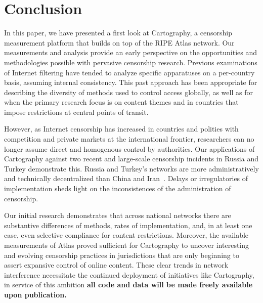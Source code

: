 \section{Conclusion}
\label{sec:conclusion}

In this paper, we have presented a first look at \textsf{Cartography}, a censorship measurement platform that builds on top of the RIPE Atlas network.  Our measurements and analysis provide an early perspective on the opportunities and methodologies possible with pervasive censorship research. Previous examinations of Internet filtering have tended to analyze specific apparatuses on a per-country basis, assuming internal consistency. This past approach has been appropriate for describing the diversity of methods used to control access globally, as well as for when the primary research focus is on content themes and in countries that impose restrictions at central points of transit. 

However, as Internet censorship has increased in countries and polities with competition and private markets at the international frontier, researchers can no longer assume direct and homogenous control by authorities. Our applications of Cartography against two recent and
large-scale censorship incidents in Russia and Turkey demonstrate this. Russia and Turkey's networks are more administratively and technically decentralized than China and Iran~\cite{Roberts2011}. Delays or irregulatories of implementation sheds light on the inconsistences of the administration of censorship. 

Our initial research demonstrates that across national networks there are substantive differences of methods, rates of implementation, and, in at least one case, even selective compliance for content restrictions. Moreover, the available measurements of Atlas proved sufficient for Cartography to uncover interesting and evolving censorship practices in jurisdictions that are only beginning to assert expansive control of online content. These clear trends in network interference necessitate the continued deployment of initiatives like Cartography, in service of this ambition \textbf{all code and data will be made freely available upon publication.}


